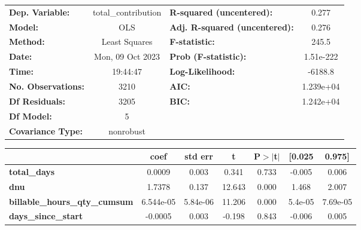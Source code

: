 \begin{center}
\begin{tabular}{lclc}
\toprule
\textbf{Dep. Variable:}               & total\_contribution & \textbf{  R-squared (uncentered):}      &     0.277   \\
\textbf{Model:}                       &         OLS         & \textbf{  Adj. R-squared (uncentered):} &     0.276   \\
\textbf{Method:}                      &    Least Squares    & \textbf{  F-statistic:       }          &     245.5   \\
\textbf{Date:}                        &   Mon, 09 Oct 2023  & \textbf{  Prob (F-statistic):}          & 1.51e-222   \\
\textbf{Time:}                        &       19:44:47      & \textbf{  Log-Likelihood:    }          &   -6188.8   \\
\textbf{No. Observations:}            &          3210       & \textbf{  AIC:               }          & 1.239e+04   \\
\textbf{Df Residuals:}                &          3205       & \textbf{  BIC:               }          & 1.242e+04   \\
\textbf{Df Model:}                    &             5       & \textbf{                     }          &             \\
\textbf{Covariance Type:}             &      nonrobust      & \textbf{                     }          &             \\
\bottomrule
\end{tabular}
\begin{tabular}{lcccccc}
                                      & \textbf{coef} & \textbf{std err} & \textbf{t} & \textbf{P$> |$t$|$} & \textbf{[0.025} & \textbf{0.975]}  \\
\midrule
\textbf{total\_days}                  &       0.0009  &        0.003     &     0.341  &         0.733        &       -0.005    &        0.006     \\
\textbf{dnu}                          &       1.7378  &        0.137     &    12.643  &         0.000        &        1.468    &        2.007     \\
\textbf{billable\_hours\_qty\_cumsum} &    6.544e-05  &     5.84e-06     &    11.206  &         0.000        &      5.4e-05    &     7.69e-05     \\
\textbf{days\_since\_start}           &      -0.0005  &        0.003     &    -0.198  &         0.843        &       -0.006    &        0.005     \\

\end{tabular}
\end{center}
